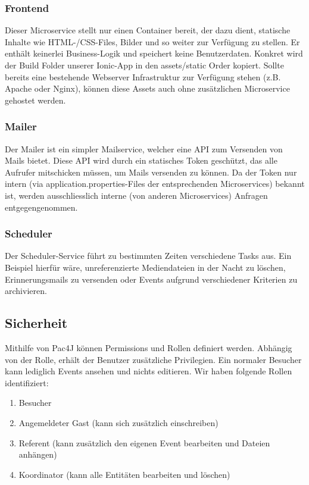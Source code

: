 \documentclass[11pt]{article} %
\begin{document}
\subsubsection{Frontend}
Dieser Microservice stellt nur einen Container bereit, der dazu dient, statische Inhalte wie HTML-/CSS-Files, Bilder und so weiter zur Verfügung zu stellen. Er enthält keinerlei Business-Logik und speichert keine Benutzerdaten. Konkret wird der Build Folder unserer Ionic-App in den assets/static Order kopiert. Sollte bereits eine bestehende Webserver Infrastruktur zur Verfügung stehen (z.B. Apache oder Nginx), können diese Assets auch ohne zusätzlichen Microservice gehostet werden.

\subsubsection{Mailer}
Der Mailer ist ein simpler Mailservice, welcher eine API zum Versenden von Mails bietet. Diese API wird durch ein statisches Token geschützt, das alle Aufrufer mitschicken müssen, um Mails versenden zu können. Da der Token nur intern (via application.properties-Files der entsprechenden Microservices) bekannt ist, werden ausschliesslich interne (von anderen Microservices) Anfragen entgegengenommen.

\subsubsection{Scheduler}
Der Scheduler-Service führt zu bestimmten Zeiten verschiedene Tasks aus. Ein Beispiel hierfür wäre, unreferenzierte  Mediendateien in der Nacht zu löschen, Erinnerungsmails zu versenden oder Events aufgrund verschiedener Kriterien zu archivieren.

\newpage
\subsection{Sicherheit}
Mithilfe von Pac4J können Permissions und Rollen definiert werden. Abhängig von der Rolle, erhält der Benutzer zusätzliche Privilegien. Ein normaler Besucher kann lediglich Events ansehen und nichts editieren. Wir haben folgende Rollen identifiziert:

\begin{enumerate}
\item Besucher
\item Angemeldeter Gast (kann sich zusätzlich einschreiben)
\item Referent (kann zusätzlich den eigenen Event bearbeiten und Dateien anhängen)
\item Koordinator (kann alle Entitäten bearbeiten und löschen)
\end{enumerate}
\end{document}
